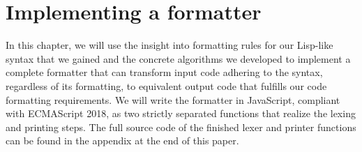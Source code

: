 \chapter{Implementing a formatter}
In this chapter, we will use the insight into formatting rules for our Lisp-like syntax that we gained
and the concrete algorithms we developed to implement a complete formatter that can transform
input code adhering to the syntax, regardless of its formatting, to
equivalent output code that fulfills our code formatting requirements.
We will write the formatter in JavaScript, compliant with ECMAScript 2018,
as two strictly separated functions that realize the lexing and printing steps.
The full source code of the finished lexer and printer functions
can be found in the appendix at the end of this paper.




